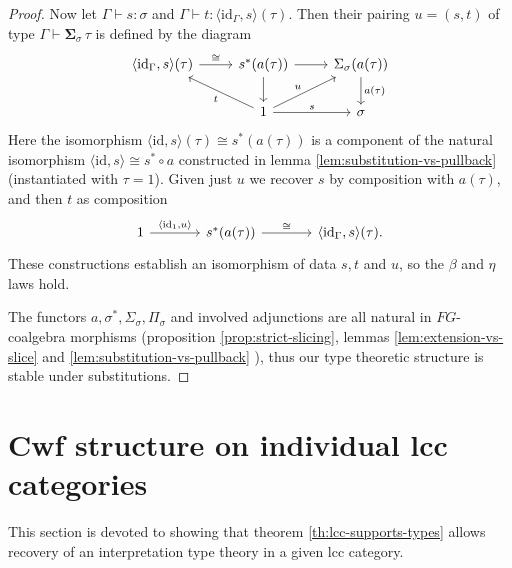 \documentclass[a4paper]{article}
\theoremstyle{remark}
\theoremstyle{definition}
\begin{document}
\begin{proof}
  Now let $\Gamma \vdash s : \sigma$ and $\Gamma \vdash t : \langle \mathrm{id}_\Gamma, s \rangle(\tau)$.
  Then their pairing $u = (s, t)$ of type $\Gamma \vdash \mathbf{\Sigma}_\sigma \, \tau$ is defined by the diagram
  \begin{equation}
    \begin{tikzcd}
      \langle \mathrm{id}_\Gamma, s \rangle(\tau) \arrow[r, "\cong"] & s^*(a(\tau)) \arrow[r] \arrow[d] & \Sigma_\sigma(a(\tau)) \arrow[d, "a(\tau)"] \\
      & 1 \arrow[ul, "t"] \arrow[r, "s"] \arrow[ur, "u"] & \sigma
    \end{tikzcd}
  \end{equation}
  Here the isomorphism $\langle \mathrm{id}, s \rangle(\tau) \cong s^*(a(\tau))$ is a component of the natural isomorphism $\langle \mathrm{id}, s \rangle \cong s^* \circ a$ constructed in lemma \ref{lem:substitution-vs-pullback} (instantiated with $\tau = 1$).
  Given just $u$ we recover $s$ by composition with $a(\tau)$, and then $t$ as composition
  \begin{equation}
    \begin{tikzcd}[column sep=large]
      1 \arrow[r, "{\langle \mathrm{id}_1, u \rangle}"] & s^*(a(\tau)) \arrow[r, "\cong"] & \langle \mathrm{id}_\Gamma, s \rangle(\tau).
    \end{tikzcd}
  \end{equation}
  These constructions establish an isomorphism of data $s, t$ and $u$, so the $\beta$ and $\eta$ laws hold.

  The functors $a, \sigma^*, \Sigma_\sigma, \Pi_\sigma$ and involved adjunctions are all natural in $FG$-coalgebra morphisms (proposition \ref{prop:strict-slicing}, lemmas \ref{lem:extension-vs-slice} and \ref{lem:substitution-vs-pullback} ), thus our type theoretic structure is stable under substitutions.
\end{proof}

\section{Cwf structure on individual lcc categories}

This section is devoted to showing that theorem \ref{th:lcc-supports-types} allows recovery of an interpretation type theory in a given lcc category.
\end{document}
